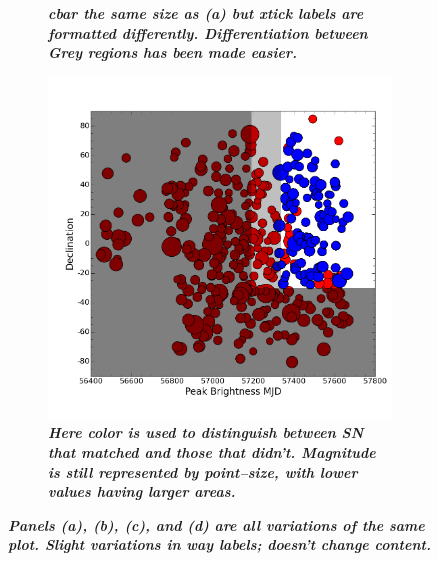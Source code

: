 \begin{figure}
\begin{subfigure}{.5\textwidth}
		\caption{\it \small{{\bf cbar the same size as (a) but xtick labels are formatted differently. Differentiation between Grey regions has been made easier.}}}
		\label{fig:var3}
	\end{subfigure}%
	\begin{subfigure}{.5\textwidth}
	  \centering
			\includegraphics[width=1\linewidth]{figures/variations/mag_ps_not_color.png}
		\caption{\it \small{{\bf Here color is used to distinguish between SN that matched and those that didn't. Magnitude is still represented by point--size, with lower values having larger areas.}}}
		\label{fig:var4}
	\end{subfigure}
	\caption{\it \small{{\bf Panels (a), (b), (c), and (d) are all variations of the same plot. Slight variations in way labels; doesn't change content.}}}
	\label{fig:variations}
\end{figure}

